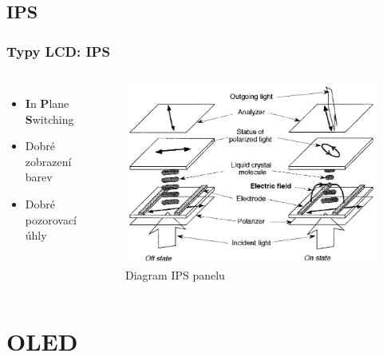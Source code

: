 \documentclass[aspectratio=169,11pt, allowframebreak=0.9]{beamer}
\begin{document}
    \subsection{IPS}
    \begin{frame}
    \frametitle{Typy LCD: IPS}
    \begin{columns}
    \begin{itemize}
        \item \textbf{I}n \textbf{P}lane \textbf{S}witching
        \item Dobré zobrazení barev
        \item Dobré pozorovací úhly
    \end{itemize}
    \begin{figure}
        \centering
        \includegraphics[width=1\textwidth]{ips}
        \caption{Diagram IPS panelu}
    \end{figure}
    \end{columns}
    \end{frame}
    \section{OLED}
\end{document}
